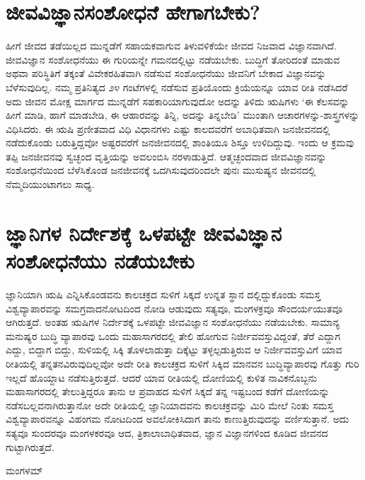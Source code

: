 \section*{ಜೀವವಿಜ್ಞಾನಸಂಶೋಧನೆ ಹೇಗಾಗಬೇಕು?}

ಹೀಗೆ ಜೀವದ ತಡೆಯಿಲ್ಲದ ಮುನ್ನಡೆಗೆ ಸಹಾಯಕವಾಗುವ ತಿಳುವಳಿಕೆಯೇ ಜೀವದ ನಿಜವಾದ ವಿಜ್ಞಾನವಾಗಿದೆ. ಜೀವವಿಜ್ಞಾನ ಸಂಶೋಧನೆಯು ಈ ಗುರಿಯನ್ನೇ ಗಮನದಲ್ಲಿಟ್ಟು ನಡೆಯಬೇಕು. ಬುದ್ಧಿಗೆ ತೋರಿದಂತೆ ಮಾಡುವ ಅಥವಾ ಪರಿಸ್ಥಿತಿಗೆ ತಕ್ಕಂತೆ ವಿವೇಕರಹಿತವಾಗಿ ನಡೆಸುವ ಸಂಶೋಧನೆಯು ಜೀವನಿಗೆ ಬೇಕಾದ ವಿಜ್ಞಾನವನ್ನು ಬೆಳೆಸುವುದಿಲ್ಲ. ನಮ್ಮ ಪ್ರತಿನಿತ್ಯದ ೨೪ ಗಂಟೆಗಳಲ್ಲಿ ನಡೆಸುವ ಪ್ರತಿಯೊಂದು ಕ್ರಿಯೆಯನ್ನೂ ಯಾವ ರೀತಿ ನಡೆಸಿದರೆ ಅದು ಜೀವನ ಮೋಕ್ಷ ಮಾರ್ಗದ ಮುನ್ನಡೆಗೆ ಸಹಕಾರಿಯಾಗುವುದೋ ಅದನ್ನು ತಿಳಿದು ಋಷಿಗಳು `ಈ ಕೆಲಸವನ್ನು ಹೀಗೆ ಮಾಡಿ, ಹಾಗೆ ಮಾಡಬೇಡಿ, ಈ ಆಹಾರವನ್ನು ತಿನ್ನಿ, ಅದನ್ನು ತಿನ್ನಬೇಡಿ' ಮುಂತಾಗಿ ಆಚಾರಗಳನ್ನು-ಶಾಸ್ತ್ರಗಳನ್ನು ವಿಧಿಸಿದರು. ಈ ಋಷಿ ಪ್ರಣೀತವಾದ ವಿಧಿ ವಿಧಾನಗಳು ಎಷ್ಟು ಕಾಲದವರೆಗೆ ಅಬಾಧಿತವಾಗಿ ಜನಜೀವನದಲ್ಲಿ ನಡೆದುಕೊಂಡು ಬರುತ್ತಿದ್ದವೋ ಅಷ್ಟರವರೆಗೆ ಜನಜೀವನದಲ್ಲಿ ಶಾಂತಿಯೂ ಶಿಸ್ತೂ ಉಳಿದಿದ್ದುವು. ಇಂದು ಆ‌ ಕ್ರಮವು ತಪ್ಪಿ ಜನಜೀವನವು ಸ್ವಚ್ಛಂದ ವೃತ್ತಿಯನ್ನು ಅವಲಂಬಿಸಿ ನರಳಾಡುತ್ತಿದೆ. ಆತ್ಮಚ್ಛಂದವಾದ ಜೀವವಿಜ್ಞಾನವನ್ನು ಸಂಶೋಧನೆಯಿಂದ ಬೆಳೆಸಿಕೊಂಡ ಜನಜೀವನಕ್ಕೆ ಒದಗಿಸುವುದರಿಂದಲೇ ಪುನಃ ಮುಸುಷ್ಯನ ಜೀವನದಲ್ಲಿ ನೆಮ್ಮದಿಯುಂಟಾಗಲು ಸಾಧ್ಯ. 

\section*{ಜ್ಞಾನಿಗಳ ನಿರ್ದೇಶಕ್ಕೆ ಒಳಪಟ್ಟೇ ಜೀವವಿಜ್ಞಾನ ಸಂಶೋಧನೆಯು ನಡೆಯಬೇಕು}

ಜ್ಞಾನಿಯಾಗಿ ಋಷಿ ಎನ್ನಿಸಿಕೊಂಡವನು ಕಾಲಚಕ್ರದ ಸುಳಿಗೆ ಸಿಕ್ಕದೆ ಉನ್ನತ ಸ್ಥಾನ ದಲ್ಲಿದ್ದುಕೊಂಡು ಸಮಸ್ತ ವಿಶ್ವವ್ಯಾಪಾರವನ್ನು ಸಮಗ್ರವಾದನೋಟದಿಂದ ನೋಡಿ ಆಡುವುದು ಸತ್ಯವೂ, ಮಂಗಳಕ್ರವೂ ಸೌಂದರ್ಯಯುತವೂ ಆಗಿರುತ್ತದೆ. ಅಂತಹ ಋಷಿಗಳ ನಿರ್ದೇಶಕ್ಕೆ ಒಳಪಟ್ಟೇ ಜೀವವಿಜ್ಞಾನ ಸಂಶೋಧನೆಯು ನಡೆಯಬೇಕು. ಸಾಮಾನ್ಯ ಮನುಷ್ಯರ ಬುದ್ಧಿ ವ್ಯಾಪಾರವು ಒಂದು ಮಹಾಸಾಗರದಲ್ಲಿ ತೇಲಿ ಹೋಗುವ ನಿರ್ಜೀವವಸ್ತುವಿದ್ದಂತೆ, ತೆರೆ ಎದ್ದಾಗ ಎದ್ದು, ಬಿದ್ದಾಗ ಬಿದ್ದು, ಸುಳಿಯಲ್ಲಿ ಸಿಕ್ಕಿ ತೊಳಲಾಡುತ್ತಾ ದಿಕ್ಕೆಟ್ಟು ತಳ್ಳಲ್ಪಡುತ್ತಿರುವ ಆ ನಿರ್ಜೀವವಸ್ತುವಿಗೆ ಯಾವ ರೀತಿಯಲ್ಲಿ ತನ್ನತನವಿರುವುದಿಲ್ಲವೋ ಅದೇ ರೀತಿ ಕಾಲಚಕ್ರದ ಸುಳಿಗೆ ಸಿಕ್ಕಿದ ಮಾನವನ ಬುದ್ಧಿವ್ಯಾಪಾರವು ಗೊತ್ತು ಗುರಿ ಇಲ್ಲದೆ ಹೊಯ್ದಾಟ ನಡೆಸುತ್ತಿರುತ್ತದೆ. ಆದರೆ ಯಾವ ರೀತಿಯಲ್ಲಿ ದೋಣಿಯಲ್ಲಿ ಕುಳಿತ ನಾವಿಕನೊಬ್ಬನು ಮಹಾಸಾಗರದಲ್ಲಿ ತೇಲುತ್ತಿದ್ದರೂ ತಾನು ಆ ಪ್ರವಾಹದ ಸುಳಿಗೆ ಸಿಕ್ಕದೆ ತನ್ನ ಇಷ್ಟಬಂದ ಕಡೆಗೆ ದೋಣಿಯನ್ನು ನಡೆಸಬಲ್ಲವನಾಗಿರುತ್ತಾನೋ ಅದೇ ರೀತಿಯಲ್ಲಿ ಜ್ಞಾನಿಯಾದವನು ಕಾಲಚಕ್ರವನ್ನು ಮಿರಿ ಮೇಲೆ ನಿಂತು ಸಮಸ್ತ ವಿಶ್ವವ್ಯಾಪಾರವನ್ನೂ ವಿಹಂಗಮ ನೋಟದಿಂದ ಅವಲೋಕಿಸಿದಾಗ ತಾನು ಕಾಣುತ್ತಿರುವುದನ್ನು ವರ್ಣಿಸುತ್ತಾನೆ. ಅದು ಸತ್ಯವೂ ಸುಂದರವೂ ಮಂಗಳಕರವೂ ಆದ, ತ್ರಿಕಾಲಾಬಾಧಿತವಾದ, ಜ್ಞಾನ ವಿಜ್ಞಾನಗಳಿಂದ ಕೂಡಿದ ಜೀವನದ ಗುಟ್ಟಾಗಿರುತ್ತದೆ.

\begin{center}
ಮಂಗಳಮ್
\end{center}


